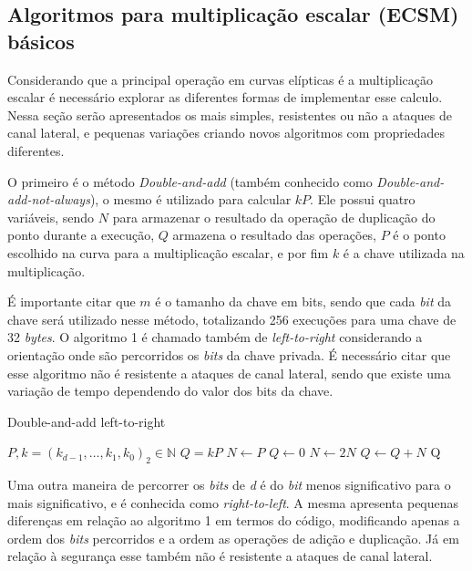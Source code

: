 \subsection{Algoritmos para multiplicação escalar (ECSM) básicos}
Considerando que a principal operação em curvas elípticas é a multiplicação escalar é necessário explorar as diferentes formas de implementar esse calculo. Nessa seção serão apresentados os mais simples, resistentes ou não a ataques de canal lateral, e pequenas variações criando novos algoritmos com propriedades diferentes.

O primeiro é o método \textit{Double-and-add} (também conhecido como \textit{Double-and-add-not-always}), o mesmo é utilizado para calcular $kP$. Ele possui quatro variáveis, sendo $N$ para armazenar o resultado da operação de duplicação do ponto durante a execução, $Q$ armazena o resultado das operações, $P$ é o ponto escolhido na curva para a multiplicação escalar, e por fim $k$ é a chave utilizada na multiplicação.

É importante citar que $m$ é o tamanho da chave em bits, sendo que cada \textit{bit} da chave será utilizado nesse método, totalizando 256 execuções para uma chave de 32 \textit{bytes}. O algoritmo 1 é chamado também de \textit{left-to-right} considerando a orientação onde são percorridos os \textit{bits} da chave privada. É necessário citar que esse algoritmo não é resistente a ataques de canal lateral, sendo que existe uma variação de tempo dependendo do valor dos bits da chave.

\begin{algorithm}[H]
\caption{Double-and-add left-to-right}
\begin{algorithmic} 
    \REQUIRE $P, k=(k_{d-1},\ldots,k_1,k_0)_2 \in \mathbb{N}$
    \ENSURE $Q = kP$
    \STATE $N \leftarrow P$
    \STATE $Q \leftarrow 0$
        \STATE $N \leftarrow 2N$
            \STATE $Q \leftarrow Q+N$
        \ENDIF
    \ENDFOR
    \RETURN Q
    \end{algorithmic}
\end{algorithm}

Uma outra maneira de percorrer os \textit{bits} de \textit{d} é do \textit{bit} menos significativo para o  mais significativo, e é conhecida como \textit{right-to-left}. A mesma apresenta pequenas diferenças em relação ao algoritmo 1 em termos do código, modificando apenas a ordem dos \textit{bits} percorridos e a ordem as operações de adição e duplicação. Já em relação à segurança esse também não é resistente a ataques de canal lateral.

